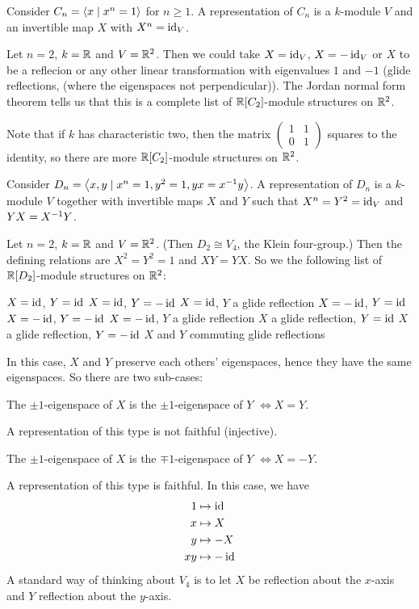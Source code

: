\begin{exam}
	\leavevmode
	\begin{enum}
		\io
		Consider $C_n = {\left\langle x \mid x^n=1 \right\rangle}$ for $n \geq 1$.
		A representation of $C_n$ is a $k$-module $V$ and an invertible map $X$ with $X^n=\operatorname{id}_V$.
		
		Let $n=2$, $k=\mathbb{R}$ and $V=\mathbb{R}^2$.
		Then we could take $X=\operatorname{id}_V$, $X=-\operatorname{id}_V$ or $X$ to be a reflecion or any other linear transformation with eigenvalues $1$ and $-1$ (glide reflections, (where the eigenspaces not perpendicular)).
		The Jordan normal form theorem tells us that this is a complete list of $\mathbb{R}[C_2]$-module structures on $\mathbb{R}^2$.
		
		Note that if $k$ has characteristic two, then the matrix
		$\left(\begin{smallmatrix}
		1 & 1 \\ 0 & 1
		\end{smallmatrix}\right)$
		squares to the identity, so there are more $\mathbb{R}[C_2]$-module structures on $\mathbb{R}^2$.
		
		\io
		Consider $D_n = {\left\langle x,y \mid x^n=1,y^2=1,yx=x^{-1} y \right\rangle}$.
		A representation of $D_n$ is a $k$-module $V$ together with invertible maps $X$ and $Y$ such that $X^n=Y^2=\operatorname{id}_V$ and $YX=X^{-1} Y$.
		
		Let $n=2$, $k=\mathbb{R}$ and $V=\mathbb{R}^2$.
		(Then $D_2 \cong V_4$, the Klein four-group.)
		Then the defining relations are $X^2=Y^2=1$ and $XY=YX$.
		So we the following list of $\mathbb{R}[D_2]$-module structures on $\mathbb{R}^2$:
		\begin{enum}
			\io $X=\operatorname{id}$, $Y=\operatorname{id}$
			\io $X=\operatorname{id}$, $Y=-\operatorname{id}$
			\io $X=\operatorname{id}$, $Y$ a glide reflection
			\io $X=-\operatorname{id}$, $Y=\operatorname{id}$
			\io $X=-\operatorname{id}$, $Y=-\operatorname{id}$
			\io\label{item:casef} $X=-\operatorname{id}$, $Y$ a glide reflection
			\io $X$ a glide reflection, $Y=\operatorname{id}$
			\io $X$ a glide reflection, $Y=-\operatorname{id}$
			\io $X$ and $Y$ commuting glide reflections
			\par
			In this case, $X$ and $Y$ preserve each others' eigenspaces, hence they have the same eigenspaces.
			So there are two sub-cases:
			\begin{enum}
				\io\label{item:case2i'}
				The $\pm1$-eigenspace of $X$ is the $\pm1$-eigenspace of $Y$ $\iff X=Y$.
				\par
				A representation of this type is not faithful (injective).
				
				\io\label{item:case2i''}
				The $\pm1$-eigenspace of $X$ is the $\mp1$-eigenspace of $Y$ $\iff X=-Y$.
				\par
				A representation of this type is faithful.
				In this case, we have
				\begin{align*}
					1 &\mapsto \operatorname{id} \\
					x &\mapsto X \\
					y &\mapsto -X \\
					xy &\mapsto -\operatorname{id}
				\end{align*}
				A standard way of thinking about $V_4$ is to let $X$ be reflection about the $x$-axis and $Y$ reflection about the $y$-axis.
				

\end{enum}
\end{enum}
\end{enum}
\end{exam}
